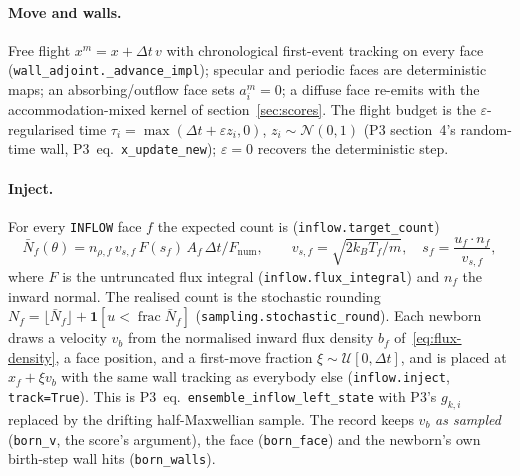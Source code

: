 \documentclass[11pt,a4paper]{article}
\numberwithin{equation}{section}
\newcommand{\ind}{\mathbf{1}}
\newcommand{\code}[1]{\texttt{#1}}
\newcommand{\pref}[1]{P3~eq.~\code{#1}}
\begin{document}
\paragraph{Move and walls.}
Free flight $x^m = x + \Delta t\, v$ with chronological first-event tracking on every
face (\code{wall\_adjoint.\_advance\_impl}); specular and periodic faces are
deterministic maps; an absorbing/outflow face sets $a^m_i = 0$; a diffuse face
re-emits with the accommodation-mixed kernel of section~\ref{sec:scores}.
The flight budget is the $\varepsilon$-regularised time $\tau_i = \max(\Delta t +
\varepsilon z_i, 0)$, $z_i \sim \mathcal N(0,1)$ (P3 section~4's random-time
wall, \pref{x\_update\_new}); $\varepsilon = 0$ recovers the deterministic step.

\paragraph{Inject.}
For every \code{INFLOW} face $f$ the expected count is (\code{inflow.target\_count})
\begin{equation}
\label{eq:target-count}
\bar N_f(\theta) = n_{\rho,f}\, v_{s,f}\, F(s_f)\, A_f\, \Delta t / F_{\mathrm{num}},
\qquad
v_{s,f} = \sqrt{2 k_B T_f/m},\quad
s_f = \frac{u_f\cdot n_f}{v_{s,f}},
\end{equation}
where $F$ is the untruncated flux integral (\code{inflow.flux\_integral}) and $n_f$
the inward normal.  The realised count is the stochastic rounding
$N_f = \lfloor \bar N_f \rfloor + \ind[u < \operatorname{frac}\bar N_f]$
(\code{sampling.stochastic\_round}).  Each newborn draws a velocity $v_b$ from the
normalised inward flux density $b_f$ of~\eqref{eq:flux-density}, a face position, and
a first-move fraction $\xi \sim \mathcal U[0,\Delta t]$, and is placed at
$x_f + \xi v_b$ with the same wall tracking as everybody else
(\code{inflow.inject}, \code{track=True}).  This is \pref{ensemble\_inflow\_left\_state}
with P3's $g_{k,i}$ replaced by the drifting half-Maxwellian sample.  The record
keeps $v_b$ \emph{as sampled} (\code{born\_v}, the score's argument), the face
(\code{born\_face}) and the newborn's own birth-step wall hits (\code{born\_walls}).
\end{document}
